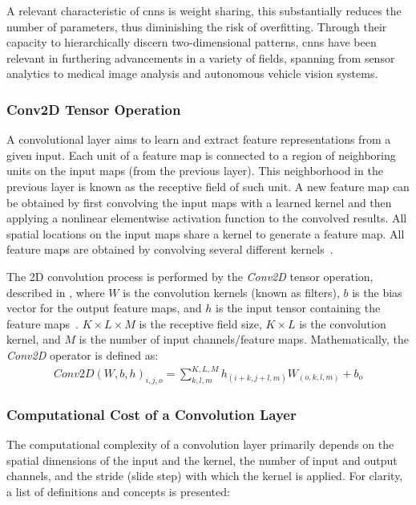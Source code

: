 A relevant characteristic of \glspl{cnn} is weight sharing, this substantially reduces the number of parameters, thus diminishing the risk of overfitting. Through their capacity to hierarchically discern two-dimensional patterns, \glspl{cnn} have been relevant in furthering advancements in a variety of fields, spanning from sensor analytics to medical image analysis and autonomous vehicle vision systems.

\subsubsection{Conv2D Tensor Operation}
A convolutional layer aims to learn and extract feature representations from a given input. Each unit of a feature map is connected to a region of neighboring units on the input maps (from the previous layer). This neighborhood in the previous layer is known as the receptive field of such unit. A new feature map can be obtained by first convolving the input maps with a learned kernel and then applying a nonlinear elementwise activation function to the convolved results. All spatial locations on the input maps share a kernel to generate a feature map. All feature maps are obtained by convolving several different kernels~\cite{gu2018recent}.


The 2D convolution process is performed by the \emph{Conv2D} tensor operation, described in , where $W$ is the convolution kernels (known as filters), $b$ is the bias vector for the output feature maps, and $h$ is the input tensor containing the feature maps~\cite{goodfellow2016deep}. $K\times L\times M$ is the receptive field size, $K\times L$ is the convolution kernel, and $M$ is the number of input channels/feature maps. Mathematically, the \emph{Conv2D} operator is defined as:
\begin{eqnarray} \label{eq:conv2D}
Conv2D\left(W,b,h\right)_{i,j,o}=\sum_{k,l,m}^{K,L,M} h_{(i+k,j+l,m)} W_{(o,k,l,m)}+b_{o}
\end{eqnarray}

\subsubsection{Computational Cost of a Convolution Layer}

The computational complexity of a convolution layer primarily depends on the spatial dimensions of the input and the kernel, the number of input and output channels, and the stride (slide step) with which the kernel is applied. For clarity, a list of definitions and concepts is presented:

